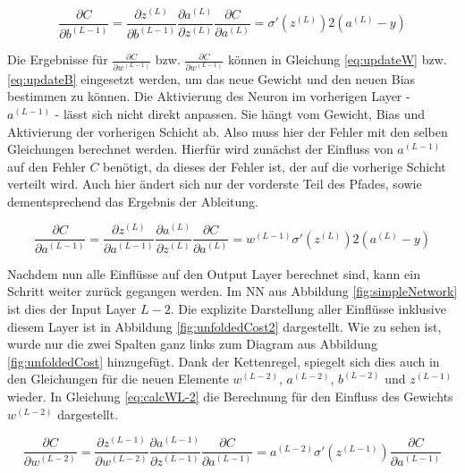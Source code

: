 \begin{equation}
    \frac{\partial C }{\partial b^{(L-1)}} =  
    \frac{\partial z^{(L)} }{\partial b^{(L-1)}}
    \frac{\partial a^{(L)} }{\partial z^{(L)}}
    \frac{\partial C }{\partial a^{(L)}} =  \sigma'(z^{(L)})
    2(a^{(L)}-y)
\end{equation}

Die Ergebnisse für $\frac{\partial C }{\partial w^{(L-1)}}$  bzw. $\frac{\partial C }{\partial w^{(L-1)}}$ können in Gleichung \ref{eq:updateW} bzw. \ref{eq:updateB} eingesetzt werden, um das neue Gewicht und den neuen Bias bestimmen zu können. Die Aktivierung des Neuron im vorherigen Layer - $a^{(L-1)}$ - lässt sich nicht direkt anpassen. Sie hängt vom Gewicht, Bias und Aktivierung der vorherigen Schicht ab. Also muss hier der Fehler mit den selben Gleichungen berechnet werden. Hierfür wird zunächst der Einfluss von $a^{(L-1)}$ auf den Fehler $C$ benötigt, da dieses der Fehler ist, der auf die vorherige Schicht verteilt wird. Auch hier ändert sich nur der vorderste Teil des Pfades, sowie dementsprechend das Ergebnis der Ableitung.

\begin{equation} \label{eq:partialCpartialaL-1}
    \frac{\partial C }{\partial a^{(L-1)}} =  
    \frac{\partial z^{(L)} }{\partial a^{(L-1)}}
    \frac{\partial a^{(L)} }{\partial z^{(L)}}
    \frac{\partial C }{\partial a^{(L)}} = w^{(L-1)}\sigma'(z^{(L)})
    2(a^{(L)}-y)
\end{equation}

Nachdem nun alle Einflüsse auf den Output Layer berechnet sind, kann ein Schritt weiter zurück gegangen werden. Im \ac{NN} aus Abbildung \ref{fig:simpleNetwork} ist dies der Input Layer $L-2$. Die explizite Darstellung aller Einflüsse inklusive diesem Layer ist in Abbildung \ref{fig:unfoldedCost2} dargestellt. Wie zu sehen ist, wurde nur die zwei Spalten ganz links zum Diagram aus Abbildung \ref{fig:unfoldedCost} hinzugefügt. Dank der Kettenregel, spiegelt sich dies auch in den Gleichungen für die neuen Elemente $w^{(L-2)}$, $a^{(L-2)}$, $b^{(L-2)}$ und $z^{(L-1)}$ wieder. In Gleichung \ref{eq:calcWL-2}  die Berechnung für den Einfluss des Gewichts $w^{(L-2)}$ dargestellt.

\begin{equation} \label{eq:calcWL-2}
    \frac{\partial C }{\partial w^{(L-2)}} = 
    \frac{\partial z^{(L-1)} }{\partial w^{(L-2)}}
    \frac{\partial a^{(L-1)} }{\partial z^{(L-1)}}
    \frac{\partial C }{\partial a^{(L-1)}} = 
    a^{(L-2)}\sigma'(z^{(L-1)}) \frac{\partial C}{\partial a^{(L-1)}}
\end{equation}

